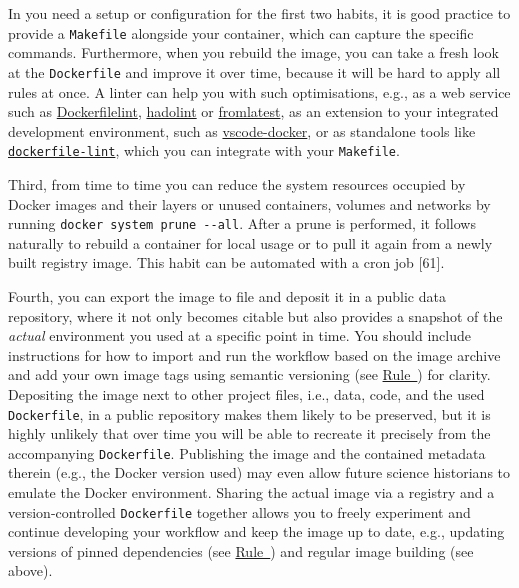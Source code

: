 \documentclass[10pt,letterpaper]{article}
\begin{document}
In you need a setup or configuration for the first two habits, it is
good practice to provide a \texttt{Makefile} alongside your container,
which can capture the specific commands. Furthermore, when you rebuild
the image, you can take a fresh look at the \texttt{Dockerfile} and
improve it over time, because it will be hard to apply all rules at
once. A linter can help you with such optimisations, e.g., as a web
service such as \href{https://www.dockerfilelint.com/}{Dockerfilelint},
\href{https://hadolint.github.io/hadolint/}{hadolint} or
\href{https://www.fromlatest.io/}{fromlatest}, as an extension to your
integrated development environment, such as
\href{https://github.com/microsoft/vscode-docker}{vscode-docker}, or as
standalone tools like
\href{https://github.com/projectatomic/dockerfile_lint}{\texttt{dockerfile-lint}},
which you can integrate with your \texttt{Makefile}.

Third, from time to time you can reduce the system resources occupied by
Docker images and their layers or unused containers, volumes and
networks by running \texttt{docker\ system\ prune\ -\/-all}. After a
prune is performed, it follows naturally to rebuild a container for
local usage or to pull it again from a newly built registry image. This
habit can be automated with a cron job {[}61{]}.

Fourth, you can export the image to file and deposit it in a public data
repository, where it not only becomes citable but also provides a
snapshot of the \emph{actual} environment you used at a specific point
in time. You should include instructions for how to import and run the
workflow based on the image archive and add your own image tags using
semantic versioning (see
\hyperref[{rule:base}]{Rule~}) for clarity.
Depositing the image next to other project files, i.e., data, code, and
the used \texttt{Dockerfile}, in a public repository makes them likely
to be preserved, but it is highly unlikely that over time you will be
able to recreate it precisely from the accompanying \texttt{Dockerfile}.
Publishing the image and the contained metadata therein (e.g., the
Docker version used) may even allow future science historians to emulate
the Docker environment. Sharing the actual image via a registry and a
version-controlled \texttt{Dockerfile} together allows you to freely
experiment and continue developing your workflow and keep the image up
to date, e.g., updating versions of pinned dependencies (see
\hyperref[{rule:pinning}]{Rule~}) and regular
image building (see above).
\end{document}

